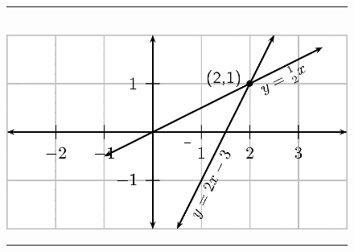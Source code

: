 	\begin{figure}[H] %
    \begin{center}
    \rule[.1in]{\figurerulewidth}{.005in} \\
        \label{m39257*uid96!!!underscore!!!media}\label{m39257*uid96!!!underscore!!!printimage}\includegraphics[width=.8\columnwidth]{col11306.imgs/m39257_MG10C10_006.png} %
        
      \vspace{2pt}
    \vspace{.1in}
    \rule[.1in]{\figurerulewidth}{.005in} \\
        
    \end{center}

 \end{figure}   

    \addtocounter{footnote}{-0}
    
